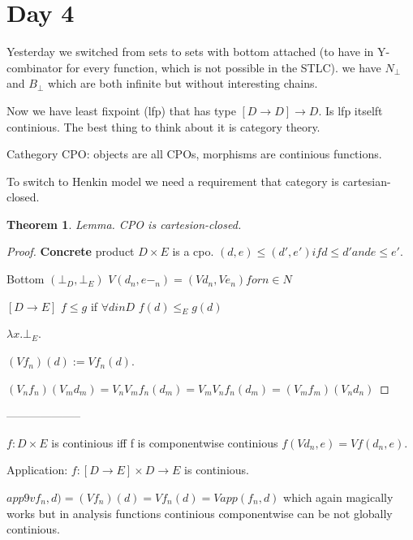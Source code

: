 \documentclass[a4paper,10pt]{book}
\newtheorem{theorem}{Theorem}
\newcommand{\rarr}{ \rightarrow }
\begin{document}
 
\section{Day 4} 
Yesterday we switched from sets to sets with bottom attached (to have in Y-combinator 
for every function, which is not possible in the STLC).
we have $N_\bot$ and $B_\bot$ which are both infinite but without interesting chains.

Now we have least fixpoint (lfp) that has type $[D\rarr D] \rarr D$. Is lfp itselft continious.
The best thing to think about it is category theory.

Cathegory CPO: objects are all CPOs, morphisms are continious functions.

To switch to Henkin model we need a requirement that category is cartesian-closed.

\begin{theorem}
Lemma. CPO is cartesion-closed. 
\end{theorem}
\begin{proof}
 \textbf{Concrete} product  $D\times E$ is a cpo. $(d,e) \leq (d',e') if d\leq d' and e\leq e'$.
 
 Bottom $(\bot_D,\bot_E)$ $V(d_n,e-_n) = (Vd_n,Ve_n) for n \in N$

 
 $[D\rarr E]$   $f\leq g$ if $\forall d in D$ $f(d) \leq_E g(d)$
 
 $\lambda x . \bot_E$.
 
 $(V f_n)(d) := Vf_n(d)$.
 
 $(V_nf_n)(V_md_m) = V_nV_m f_n(d_m) = V_mV_n f_n(d_m) = (V_mf_m)(V_nd_n)$
\end{proof}
 
 --------------------
 
 $f: D \times E$ is continious iff f is componentwise continious $f(Vd_n, e) = Vf(d_n,e)$.
 
 Application: $f: [D \rarr E] \times D \rarr E$ is continious.
 
 $app 9vf_n,d) = (Vf_n)(d) = Vf_n(d) = Vapp(f_n,d)$ which again magically works but in 
 analysis functions continious componentwise can be not globally continious.
 
\end{document}
